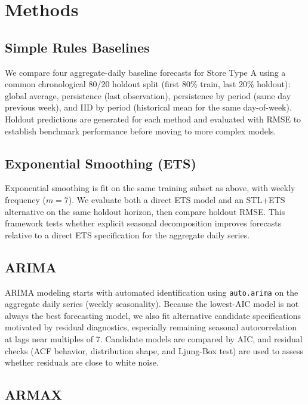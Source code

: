 \documentclass[
  12pt,
]{article}
\begin{document}
\section{Methods}\label{methods}

\subsection{Simple Rules Baselines}\label{simple-rules-baselines}

We compare four aggregate-daily baseline forecasts for Store Type A
using a common chronological 80/20 holdout split (first 80\% train, last
20\% holdout): global average, persistence (last observation),
persistence by period (same day previous week), and IID by period
(historical mean for the same day-of-week). Holdout predictions are
generated for each method and evaluated with RMSE to establish benchmark
performance before moving to more complex models.

\subsection{Exponential Smoothing
(ETS)}\label{exponential-smoothing-ets}

Exponential smoothing is fit on the same training subset as above, with
weekly frequency (\(m=7\)). We evaluate both a direct ETS model and an
STL+ETS alternative on the same holdout horizon, then compare holdout
RMSE. This framework tests whether explicit seasonal decomposition
improves forecasts relative to a direct ETS specification for the
aggregate daily series.

\subsection{ARIMA}\label{arima}

ARIMA modeling starts with automated identification using
\texttt{auto.arima} on the aggregate daily series (weekly seasonality).
Because the lowest-AIC model is not always the best forecasting model,
we also fit alternative candidate specifications motivated by residual
diagnostics, especially remaining seasonal autocorrelation at lags near
multiples of 7. Candidate models are compared by AIC, and residual
checks (ACF behavior, distribution shape, and Ljung-Box test) are used
to assess whether residuals are close to white noise.

\subsection{ARMAX}\label{armax}
\end{document}
